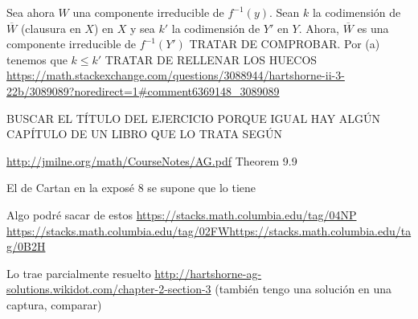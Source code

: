 \documentclass[twoside]{article}
\begin{document}
\begin{solucion}
\begin{enumerate}[(a)]
Sea ahora $W$ una componente irreducible de $f^{-1}(y)$. Sean $k$ la codimensión de $\overline{W}$ (clausura en $X$) en $X$ y sea $k'$ la codimensión de $Y'$ en $Y$. Ahora, $\overline{W}$ es una componente irreducible de $f^{-1}(Y')$ TRATAR DE COMPROBAR. Por (a) tenemos que $k\leq k'$ TRATAR DE RELLENAR LOS HUECOS \url{https://math.stackexchange.com/questions/3088944/hartshorne-ii-3-22b/3089089?noredirect=1#comment6369148_3089089}

\end{enumerate}
BUSCAR EL TÍTULO DEL EJERCICIO PORQUE IGUAL HAY ALGÚN CAPÍTULO DE UN LIBRO QUE LO TRATA SEGÚN 

\url{http://jmilne.org/math/CourseNotes/AG.pdf} Theorem 9.9

El de Cartan en la exposé 8 se supone que lo tiene

Algo podré sacar de estos \url{https://stacks.math.columbia.edu/tag/04NP} \url{https://stacks.math.columbia.edu/tag/02FW}\url{https://stacks.math.columbia.edu/tag/0B2H}

Lo trae parcialmente resuelto \url{http://hartshorne-ag-solutions.wikidot.com/chapter-2-section-3} (también tengo una solución en una captura, comparar)



\end{solucion}
\end{document}
